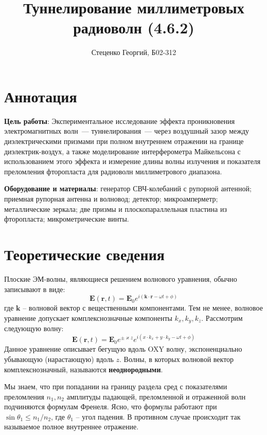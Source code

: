 \documentclass[12pt, a4paper]{article}
\title{Туннелирование миллиметровых радиоволн (4.6.2)}
\author{Стеценко Георгий, Б02-312}
\date{}
\begin{document}
\maketitle

\section{Аннотация}
\sloppy
\textbf{Цель работы}: Экспериментальное исследование эффекта проникновения электро\-ма\-гнит\-ных 
волн~— туннелирования~— через воздушный зазор между диэлектрическими призмами при полном внутреннем 
отражении на границе диэлектрик-воздух, а также моделирование интерферометра Майкельсона с 
использованием этого эффекта и измерение длины волны излучения и показателя преломления фторопласта
для радиоволн миллиметрового диапазона.

\textbf{Оборудование и материалы}:  генератор СВЧ-колебаний с рупорной антенной; приемная рупорная 
антенна и волновод; детектор; микроамперметр; металлические зеркала; две призмы и плоскопараллельная
пластина из фторопласта; микрометрические винты.


\section{Теоретические сведения}
Плоские ЭМ-волны, являющиеся решением волнового уравнения, обычно записывают в виде:
\begin{equation}
  \mathbf{E}(\mathbf{r}, t) = \mathbf{E}_0 e^{i(\mathbf{k} \cdot \mathbf{r} - \omega t + \phi)}
  \label{eq:plane_wave_complex}
\end{equation}
где $\mathbf{k}$ -- волновой вектор с вещественными компонентами. Тем не менее, волновое уравнение 
допускает комплекснозначные компоненты $k_x, k_y, k_z$. Рассмотрим следующую волну:
\begin{equation}
  \mathbf{E}(\mathbf{r}, t) = \mathbf{E}_0 e^{\pm \varkappa z} e^{i(x \cdot k_x + y \cdot k_y  - \omega t + \phi)}
  \label{eq:non_uniform_wave}
\end{equation}
Данное уравнение описывает бегущую вдоль OXY волну, экспоненциально убывающую (нарастающую) вдоль $z$.
Волны, в которых волновой вектор комплекснозначный, называются \textbf{неоднородными}.

Мы знаем, что при попадании на границу раздела сред с показателями преломления $n_1, n_2$ амплитуды 
падающей, преломленной и отраженной волн подчиняются формулам Френеля. Ясно, что формулы работают при
$\sin \theta_1 \leq n_1/n_2$, где $\theta_1$ -- угол падения. В противном случае происходит так называемое
полное внутреннее отражение. 
\end{document}
